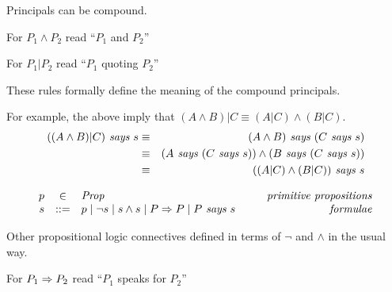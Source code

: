 Principals can be compound.

\begin{citemize}
  \item For $P_1 \wedge P_2$ read ``$P_1$ and $P_2$''
  \item For $P_1|P_2$ read ``$P_1$ quoting $P_2$''
\end{citemize}

\stopslide



These rules formally define the meaning of the compound principals.
\begin{mathpar}

\end{mathpar}

For example, the above imply that $(A \wedge B)|C \equiv (A|C) \wedge
(B|C)$.
\begin{eqnarray*}
  ((A \wedge B)|C) \says s & \equiv & (A \wedge B) \says (C \says s) \\
                           & \equiv & (A \says (C \says s)) \wedge
                                      (B \says (C \says s)) \\
                           & \equiv & ((A|C) \wedge (B|C)) \says s
\end{eqnarray*}

\stopslide


$$\begin{array}{rcl@{\hspace{10mm}}r}
p &\in& \mathit{Prop}   & \gdesc{primitive propositions} \\
s &::=&  p \mid \neg s \mid s \wedge s \mid P \speaksfor P \mid P \says s & \gdesc{formulae}
\end{array}$$

\begin{citemize}
  \item Other propositional logic connectives defined in terms of $\neg$
    and $\wedge$ in the usual way.
  \item For $P_1 \speaksfor P_2$ read ``$P_1$ speaks for $P_2$''
\end{citemize}

\stopslide


